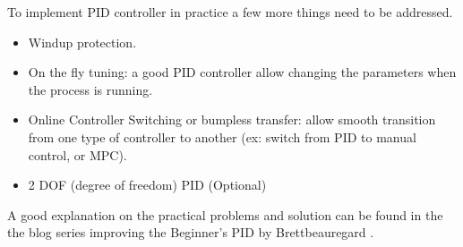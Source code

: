 To implement PID controller in practice a few more things need to be addressed.

\begin{itemize}
    \item Windup protection.
    \item On the fly tuning: a good PID controller allow changing the parameters when the process is running.
    \item Online Controller Switching or bumpless transfer:  allow smooth transition from one type of controller to another (ex: switch from PID to manual control, or MPC).
    \item 2 DOF (degree of freedom) PID (Optional) 
\end{itemize}

A good explanation on the practical problems and solution can be found in the the blog series improving the Beginner’s PID by Brettbeauregard \cite{Improving_PID}.


\newpage

